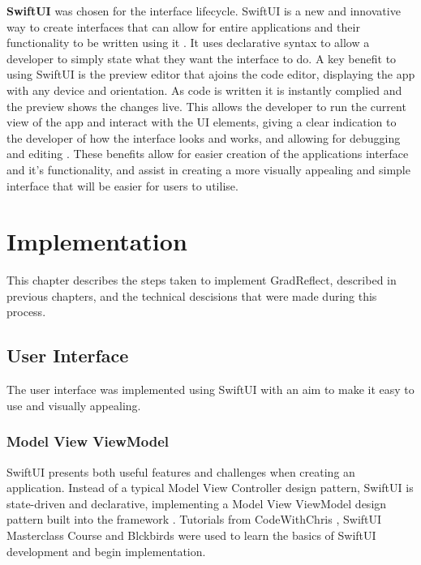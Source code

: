 \documentclass{l4proj}
\begin{document}
\textbf{SwiftUI} was chosen for the interface lifecycle. SwiftUI is a new and innovative way to create interfaces that can allow for entire applications and their functionality to be written using it \citep{apple_developer_xcode_2021}. It uses declarative syntax to allow a developer to simply state what they want the interface to do. A key benefit to using SwiftUI is the preview editor that ajoins the code editor, displaying the app with any device and orientation. As code is written it is instantly complied and the preview shows the changes live. This allows the developer to run the current view of the app and interact with the UI elements, giving a clear indication to the developer of how the interface looks and works, and allowing for debugging and editing \citep{apple_swiftui_2021}. These benefits allow for easier creation of the applications interface and it's functionality, and assist in creating a more visually appealing and simple interface that will be easier for users to utilise.



\chapter{Implementation} \label{implementation}

This chapter describes the steps taken to implement GradReflect, described in previous chapters, and the technical descisions that were made during this process.

\section{User Interface}

The user interface was implemented using SwiftUI with an aim to make it easy to use and visually appealing. 

\subsection{Model View ViewModel}

SwiftUI presents both useful features and challenges when creating an application. Instead of a typical Model View Controller design pattern, SwiftUI is state-driven and declarative, implementing a Model View ViewModel design pattern built into the framework \citep{naumov_swiftui_architecture_2019}. Tutorials from CodeWithChris \citep{ching_codewithchris_2021}, SwiftUI Masterclass Course \citep{petras_swiftui_2021} and Blckbirds \citep{blckbirds_learn_2021} were used to learn the basics of SwiftUI development and begin implementation.
\end{document}
